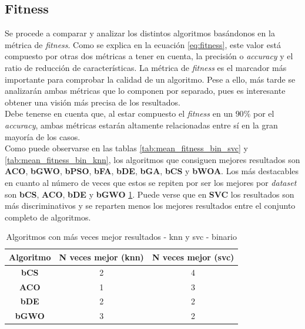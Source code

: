 \subsection{Fitness}
Se procede a comparar y analizar los distintos algoritmos basándonos en la métrica de \textit{fitness}. Como se explica en la ecuación \ref{eq:fitness}, este valor está compuesto por otras dos métricas a tener en cuenta, la precisión o \textit{accuracy} y el ratio de reducción de características. La métrica de \textit{fitness} es el marcador más importante para comprobar la calidad de un algoritmo. Pese a ello, más tarde se analizarán ambas métricas que lo componen por separado, pues es interesante obtener una visión más precisa de los resultados.\\[6pt]
Debe tenerse en cuenta que, al estar compuesto el \textit{fitness} en un $90\%$ por el \textit{accuracy}, ambas métricas estarán altamente relacionadas entre sí en la gran mayoría de los casos.\\[6pt]
Como puede observarse en las tablas \ref{tab:mean_fitness_bin_svc} y \ref{tab:mean_fitness_bin_knn}, los algoritmos que consiguen mejores resultados son \textbf{ACO}, \textbf{bGWO}, \textbf{bPSO}, \textbf{bFA}, \textbf{bDE}, \textbf{bGA}, \textbf{bCS} y \textbf{bWOA}. Los más destacables en cuanto al número de veces que estos se repiten por ser los mejores por \textit{dataset} son \textbf{bCS}, \textbf{ACO}, \textbf{bDE} y \textbf{bGWO} \ref{tab:n-best-fitness_combined}. Puede verse que en \textbf{SVC} los resultados son más discriminativos y se reparten menos los mejores resultados entre el conjunto completo de algoritmos.

\begin{table}[htp]
    \centering
    \begin{tabular}{ccc}
        \toprule
        Algoritmo     & N veces mejor (knn) & N veces mejor (svc) \\
        \midrule
        \textbf{bCS}  & 2                   & 4                   \\
        \textbf{ACO}  & 1                   & 3                   \\
        \textbf{bDE}  & 2                   & 2                   \\
        \textbf{bGWO} & 3                   & 2                   \\
        \bottomrule
    \end{tabular}
    \caption{Algoritmos con más veces mejor resultados - knn y svc - binario}
    \label{tab:n-best-fitness_combined}
\end{table}

